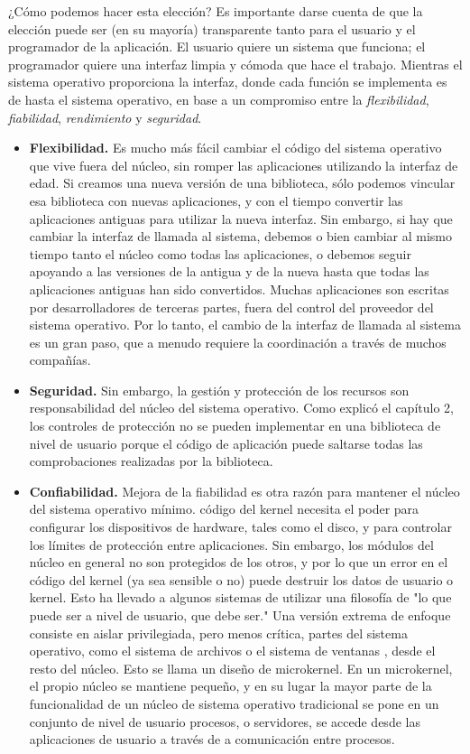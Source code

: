 \documentclass[10pt]{book}
\begin{document}
¿Cómo podemos hacer esta elección? Es importante darse cuenta de que la elección puede ser (en su mayoría) transparente tanto para el usuario y el programador de la aplicación. El usuario quiere un sistema que funciona; el programador quiere una interfaz limpia y cómoda que hace el trabajo. Mientras el sistema operativo proporciona la interfaz, donde cada función se implementa es de hasta el sistema operativo, en base a un compromiso entre la \textit{flexibilidad}, \textit{fiabilidad}, \textit{rendimiento} y \textit{seguridad}.

\begin{itemize}
\item \textbf{Flexibilidad.} Es mucho más fácil cambiar el código del sistema operativo que vive fuera del núcleo, sin romper las aplicaciones utilizando la interfaz de edad. Si creamos una nueva versión de una biblioteca, sólo podemos vincular esa biblioteca con nuevas aplicaciones, y con el tiempo convertir las aplicaciones antiguas para utilizar la nueva interfaz. Sin embargo, si hay que cambiar la interfaz de llamada al sistema, debemos o bien cambiar al mismo tiempo tanto el núcleo como todas las aplicaciones, o debemos seguir apoyando a las versiones de la antigua y de la nueva hasta que todas las aplicaciones antiguas han sido convertidos. Muchas aplicaciones son escritas por desarrolladores de terceras partes, fuera del control del proveedor del sistema operativo. Por lo tanto, el cambio de la interfaz de llamada al sistema es un gran paso, que a menudo requiere la coordinación a través de muchos
compañías.

\item \textbf{Seguridad.} Sin embargo, la gestión y protección de los recursos son responsabilidad del núcleo del sistema operativo. Como explicó el capítulo 2, los controles de protección no se pueden implementar en una biblioteca de nivel de usuario porque el código de aplicación puede saltarse todas las comprobaciones realizadas por la biblioteca.

\item \textbf{Confiabilidad.} Mejora de la fiabilidad es otra razón para mantener el núcleo del sistema operativo mínimo. código del kernel necesita el poder para configurar los dispositivos de hardware, tales como el disco, y para controlar los límites de protección entre aplicaciones. Sin embargo, los módulos del núcleo en general no son protegidos de los otros, y por lo que un error en el código del kernel (ya sea sensible o no) puede destruir los datos de usuario o kernel. Esto ha llevado a algunos sistemas de utilizar una filosofía de "lo que puede ser a nivel de usuario, que debe ser." Una versión extrema de enfoque consiste en aislar privilegiada, pero menos crítica, partes del sistema operativo, como el sistema de archivos o el sistema de ventanas , desde el resto del núcleo. Esto se llama un diseño de microkernel. En un microkernel, el propio núcleo se mantiene pequeño, y en su lugar la mayor parte de la funcionalidad de un núcleo de sistema operativo tradicional se pone en un conjunto de nivel de usuario
procesos, o servidores, se accede desde las aplicaciones de usuario a través de a comunicación entre procesos.


\end{itemize}
\end{document}
